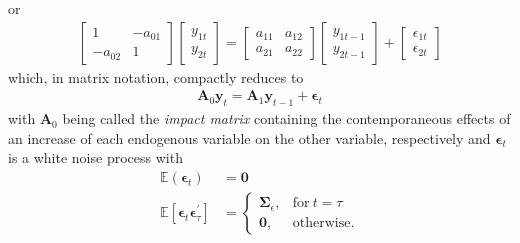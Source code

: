 \documentclass[a4paper,11pt,listof=nochaptergap,oneside,pointednumbers,bibtotoc,bigheadings,liststotoc,hidelinks]{scrbook}
\theoremstyle{mysatz}
\theoremstyle{mydefinition}
\theoremstyle{mytheorem}
\theoremstyle{mybemerkung}
\newcommand{\vect}[1]{\boldsymbol{\mathbf{#1}}}
\begin{document}
or 
\begin{equation} \label{eq:svar3}
\begin{split}
	\begin{bmatrix}
    	1 & -a_{01} \\
    	-a_{02} & 1
 	\end{bmatrix}
	\begin{bmatrix}
    	y_{1t} \\
    	y_{2t}
 	\end{bmatrix} = 
	\begin{bmatrix}
    	a_{11} & a_{12} \\
    	a_{21} & a_{22}
 	\end{bmatrix} 
	\begin{bmatrix}
    	y_{1t-1} \\
    	y_{2t-1}
 	\end{bmatrix} +
	\begin{bmatrix}
    	\epsilon_{1t} \\
    	\epsilon_{2t}
 	\end{bmatrix} 
\end{split}								
\end{equation}
which, in matrix notation, compactly reduces to 
\begin{equation} \label{eq:svar4}
\begin{split}
	\vect{A}_0\vect{y}_t = \vect{A}_1\vect{y}_{t-1} + \vect{\epsilon}_t
\end{split}								
\end{equation}
with $\vect{A}_0$ being called the \textit{impact matrix} containing the contemporaneous effects of an increase of each endogenous variable on the other variable, respectively and $\vect{\epsilon}_t$ is a white noise process with
\begin{equation}
\begin{split}
	\mathbb{E}(\vect{\epsilon}_t) &  = \vect{0}  \\
	\mathbb{E}[\vect{\epsilon}_t\vect{\epsilon}_{\tau}^']  & =     \begin{cases}
      												\vect{\Sigma}_\epsilon, & \text{for}\ t = \tau \\
      												\vect{0}, & \text{otherwise.}
   								  \end{cases}
\end{split}								
\end{equation}
\end{document}

